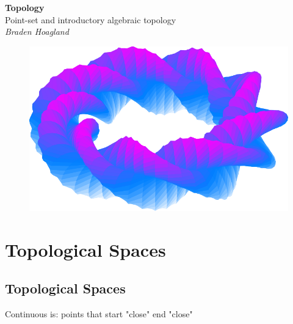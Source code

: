 \documentclass[10pt]{report}
\begin{document}
\begin{titlepage}
	\begin{center}
		{\Huge\textbf{Topology}}\\
		\vspace{4mm}
		Point-set and introductory algebraic topology\\
		\vspace{6mm}
		\textit{Braden Hoagland}
	\end{center}
	\begin{figure}[H]
		\centering
		\includegraphics[scale=0.9]{fig/curvy-donut.pdf}
	\end{figure}
	
\end{titlepage}

\tableofcontents



\chapter{Topological Spaces}


\section{Topological Spaces}

{\color{red}Continuous is: points that start "close" end "close"}
\end{document}
